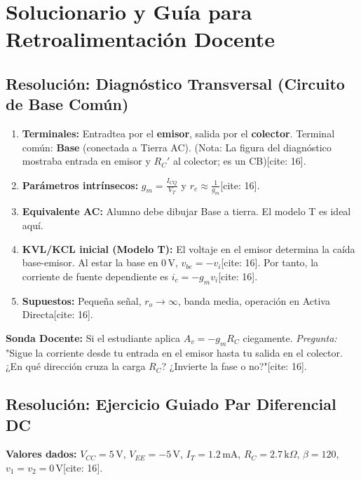 \documentclass[11pt, a4paper]{article}
\begin{document}
\section*{Solucionario y Guía para Retroalimentación Docente}

\subsection*{Resolución: Diagnóstico Transversal (Circuito de Base Común)}
\begin{enumerate}
    \item \textbf{Terminales:} Entradtea por el \textbf{emisor}, salida por el \textbf{colector}. Terminal común: \textbf{Base} (conectada a Tierra AC). (Nota: La figura del diagnóstico mostraba entrada en emisor y $R_C'$ al colector; es un CB)[cite: 16].
    \item \textbf{Parámetros intrínsecos:} $g_m = \frac{I_{CQ}}{V_T}$ y $r_e \approx \frac{1}{g_m}$[cite: 16].
    \item \textbf{Equivalente AC:} Alumno debe dibujar Base a tierra. El modelo T es ideal aquí.
    \item \textbf{KVL/KCL inicial (Modelo T):} El voltaje en el emisor determina la caída base-emisor. Al estar la base en $0\,\text{V}$, $v_{be} = -v_i$[cite: 16]. Por tanto, la corriente de fuente dependiente es $i_c = -g_m v_i$[cite: 16].
    \item \textbf{Supuestos:} Pequeña señal, $r_o \to \infty$, banda media, operación en Activa Directa[cite: 16].
\end{enumerate}
\textbf{Sonda Docente:} Si el estudiante aplica $A_v = -g_m R_C$ ciegamente. \textit{Pregunta:} "Sigue la corriente desde tu entrada en el emisor hasta tu salida en el colector. ¿En qué dirección cruza la carga $R_C$? ¿Invierte la fase o no?"[cite: 16].

\subsection*{Resolución: Ejercicio Guiado Par Diferencial DC}
\textbf{Valores dados:} $V_{CC}=5\,\text{V}$, $V_{EE}=-5\,\text{V}$, $I_T=1.2\,\text{mA}$, $R_C=2.7\,\text{k}\Omega$, $\beta=120$, $v_1=v_2=0\,\text{V}$[cite: 16].
\end{document}
